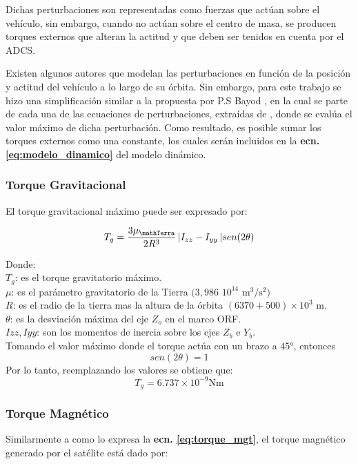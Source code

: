 Dichas perturbaciones son representadas como fuerzas que actúan sobre el vehículo, sin embargo, cuando no actúan sobre el centro de masa, se producen torques externos que alteran la actitud y que deben ser tenidos en cuenta por el ADCS.

Existen algunos autores \cite{zapf2006robust}\cite{Andresen2005} que modelan las perturbaciones en función de la posición y actitud del vehículo a lo largo de su órbita. Sin embargo, para este trabajo se hizo una simplificación similar a la propuesta por P.S Bayod \cite{tes:Sorolla2019}, en la cual se parte de cada una de las ecuaciones de perturbaciones, extraídas de \cite{hughes2012spacecraft}, donde se evalúa el valor máximo de dicha perturbación. Como resultado, es posible sumar los torques externos como una constante, los cuales serán incluidos en la \textbf{ecn. \eqref{eq:modelo_dinamico}} del modelo dinámico.

\subsubsection{Torque Gravitacional}
\hfill \break
El torque gravitacional máximo puede ser expresado por:

\begin{equation}
T_g = \frac{3\mu_\mathTerra}{2R^3}\,\lvert I_{zz} -I_{yy}\,\rvert sen(2\theta)\label{eq:torque_grav}
\end{equation}

\noindent Donde:\\
$T_g$: es el torque gravitatorio máximo.\\
$\mu$: es el parámetro gravitatorio de la Tierra $(3,986$ $10^{14}$ $ \mathrm{m^3/s^2})$\\
$R$: es el radio de la tierra mas la altura de la órbita $(6370 + 500)\times10^3$ m.\\
$\theta$: es la desviación máxima del eje $Z_o$ en el marco ORF.\\
$I{zz}, I{yy}$: son los momentos de inercia sobre los ejes $Z_b$ e $Y_b$.\\

\noindent Tomando el valor máximo donde el torque actúa con un brazo a $45°$, entonces 
$$sen(2\theta) = 1$$
Por lo tanto, reemplazando los valores se obtiene que: 
$$T_g = 6.737\times10^{-9} \mathrm{Nm}$$

\subsubsection{Torque Magnético}
\hfill \break
Similarmente a como lo expresa la \textbf{ecn. \eqref{eq:torque_mgt}}, el torque magnético generado por el satélite está dado por:

